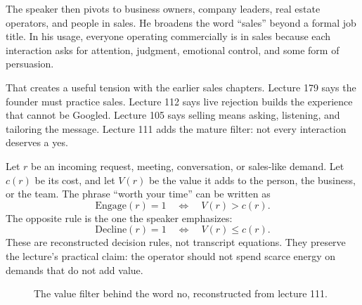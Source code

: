 \documentclass[11pt,oneside]{book}
\begin{document}
The speaker then pivots to business owners, company leaders, real estate operators, and people in sales. He broadens the word ``sales'' beyond a formal job title. In his usage, everyone operating commercially is in sales because each interaction asks for attention, judgment, emotional control, and some form of persuasion.

That creates a useful tension with the earlier sales chapters. Lecture 179 says the founder must practice sales. Lecture 112 says live rejection builds the experience that cannot be Googled. Lecture 105 says selling means asking, listening, and tailoring the message. Lecture 111 adds the mature filter: not every interaction deserves a yes.

Let \(r\) be an incoming request, meeting, conversation, or sales-like demand. Let \(c(r)\) be its cost, and let \(V(r)\) be the value it adds to the person, the business, or the team. The phrase ``worth your time'' can be written as
\[
\mathrm{Engage}(r)=1
\quad\Longleftrightarrow\quad
V(r)>c(r).
\]
The opposite rule is the one the speaker emphasizes:
\[
\mathrm{Decline}(r)=1
\quad\Longleftrightarrow\quad
V(r)\leq c(r).
\]
These are reconstructed decision rules, not transcript equations. They preserve the lecture's practical claim: the operator should not spend scarce energy on demands that do not add value.

\begin{figure}
\centering
{}
\caption{The value filter behind the word no, reconstructed from lecture 111.}
\end{figure}
\end{document}

